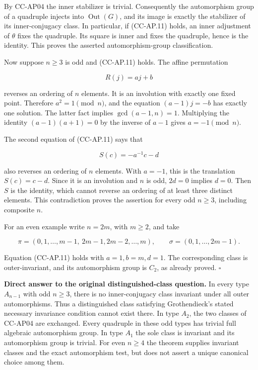 By CC-AP04 the inner stabilizer is trivial. Consequently the
automorphism group of a quadruple injects into
\(\operatorname{Out}(G)\), and its image is exactly the stabilizer of
its inner-conjugacy class. In particular, if (CC-AP.11) holds, an inner
adjustment of \(\theta\) fixes the quadruple. Its square is inner and
fixes the quadruple, hence is the identity. This proves the asserted
automorphism-group classification.

Now suppose \(n\geq3\) is odd and (CC-AP.11) holds. The affine
permutation

\[
 R(j)=aj+b
\]

reverses an ordering of \(n\) elements. It is an involution with exactly
one fixed point. Therefore \(a^2=1\pmod n\), and the equation
\((a-1)j=-b\) has exactly one solution. The latter fact implies
\(\gcd(a-1,n)=1\). Multiplying the identity \((a-1)(a+1)=0\) by the
inverse of \(a-1\) gives \(a=-1\pmod n\).

The second equation of (CC-AP.11) says that

\[
 S(c)=-a^{-1}c-d
\]

also reverses an ordering of \(n\) elements. With \(a=-1\), this is the
translation \(S(c)=c-d\). Since it is an involution and \(n\) is odd,
\(2d=0\) implies \(d=0\). Then \(S\) is the identity, which cannot
reverse an ordering of at least three distinct elements. This
contradiction proves the assertion for every odd \(n\geq3\), including
composite \(n\).

For an even example write \(n=2m\), with \(m\geq2\), and take

\[
 \pi=(0,1,\ldots,m-1,\ 2m-1,2m-2,\ldots,m),\qquad
 \sigma=(0,1,\ldots,2m-1).
\]

Equation (CC-AP.11) holds with \(a=1,b=m,d=1\). The corresponding class
is outer-invariant, and its automorphism group is \(C_2\), as already
proved. \(\square\)

\textbf{Direct answer to the original distinguished-class question.} In
every type \(A_{n-1}\) with odd \(n\geq3\), there is no inner-conjugacy
class invariant under all outer automorphisms. Thus a distinguished
class satisfying Grothendieck's stated necessary invariance condition
cannot exist there. In type \(A_2\), the two classes of CC-AP04 are
exchanged. Every quadruple in these odd types has trivial full algebraic
automorphism group. In type \(A_1\) the sole class is invariant and its
automorphism group is trivial. For even \(n\geq4\) the theorem supplies
invariant classes and the exact automorphism test, but does not assert a
unique canonical choice among them.

